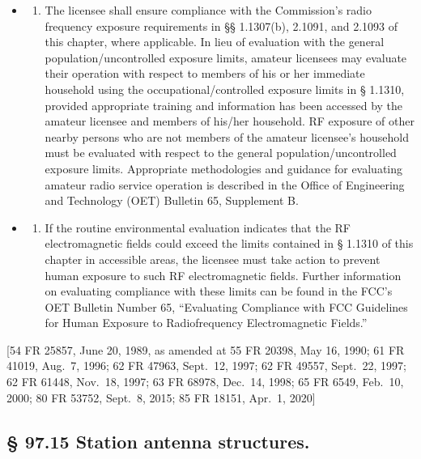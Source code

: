 \documentclass[
  letterpaper,
  DIV=11,
  numbers=noendperiod]{scrreport}
\providecommand{\tightlist}{%
  \setlength{\itemsep}{0pt}\setlength{\parskip}{0pt}}\usepackage{longtable,booktabs,array}
\begin{document}
\begin{itemize}
\item
  \begin{enumerate}
  \def\labelenumi{(\arabic{enumi})}
  \tightlist
  \item
    The licensee shall ensure compliance with the Commission's radio
    frequency exposure requirements in §§ 1.1307(b), 2.1091, and 2.1093
    of this chapter, where applicable. In lieu of evaluation with the
    general population/uncontrolled exposure limits, amateur licensees
    may evaluate their operation with respect to members of his or her
    immediate household using the occupational/controlled exposure
    limits in § 1.1310, provided appropriate training and information
    has been accessed by the amateur licensee and members of his/her
    household. RF exposure of other nearby persons who are not members
    of the amateur licensee's household must be evaluated with respect
    to the general population/uncontrolled exposure limits. Appropriate
    methodologies and guidance for evaluating amateur radio service
    operation is described in the Office of Engineering and Technology
    (OET) Bulletin 65, Supplement B.
  \end{enumerate}
\item
  \begin{enumerate}
  \def\labelenumi{(\arabic{enumi})}
  \setcounter{enumi}{1}
  \tightlist
  \item
    If the routine environmental evaluation indicates that the RF
    electromagnetic fields could exceed the limits contained in § 1.1310
    of this chapter in accessible areas, the licensee must take action
    to prevent human exposure to such RF electromagnetic fields. Further
    information on evaluating compliance with these limits can be found
    in the FCC's OET Bulletin Number 65, ``Evaluating Compliance with
    FCC Guidelines for Human Exposure to Radiofrequency Electromagnetic
    Fields.''
  \end{enumerate}
\end{itemize}

{[}54 FR 25857, June 20, 1989, as amended at 55 FR 20398, May 16, 1990;
61 FR 41019, Aug.~7, 1996; 62 FR 47963, Sept.~12, 1997; 62 FR 49557,
Sept.~22, 1997; 62 FR 61448, Nov.~18, 1997; 63 FR 68978, Dec.~14, 1998;
65 FR 6549, Feb.~10, 2000; 80 FR 53752, Sept.~8, 2015; 85 FR 18151,
Apr.~1, 2020{]}

\hypertarget{station-antenna-structures.}{%
\subsection*{§ 97.15 Station antenna
structures.}\label{station-antenna-structures.}}
\end{document}
